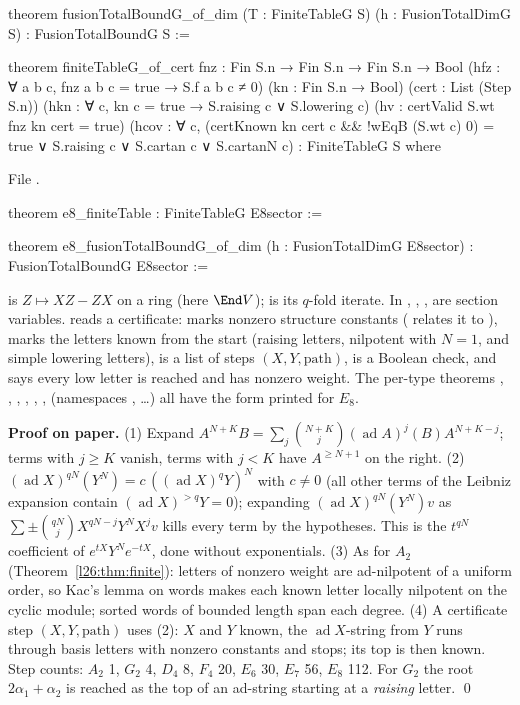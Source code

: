 \begin{leancode}
theorem fusionTotalBoundG_of_dim (T : FiniteTableG S) (h : FusionTotalDimG S) :
    FusionTotalBoundG S :=

theorem finiteTableG_of_cert {fnz : Fin S.n → Fin S.n → Fin S.n → Bool}
    (hfz : ∀ a b c, fnz a b c = true → S.f a b c ≠ 0) (kn : Fin S.n → Bool) (cert : List (Step S.n))
    (hkn : ∀ c, kn c = true → S.raising c ∨ S.lowering c) (hv : certValid S.wt fnz kn cert = true)
    (hcov : ∀ c, (certKnown kn cert c && !wEqB (S.wt c) 0) = true ∨
      S.raising c ∨ S.cartan c ∨ S.cartanN c) :
    FiniteTableG S where
\end{leancode}
\noindent File .
\begin{leancode}
theorem e8_finiteTable : FiniteTableG E8sector :=

theorem e8_fusionTotalBoundG_of_dim (h : FusionTotalDimG E8sector) :
    FusionTotalBoundG E8sector :=
\end{leancode}

\begin{dictionary}
 is $Z\mapsto XZ-ZX$ on a ring (here $\End V$);  is its $q$-fold iterate. In
, , ,  are section variables.  reads a
certificate:  marks nonzero structure constants ( relates it to ),  marks the letters known
from the start (raising letters, nilpotent with $N=1$, and simple lowering letters),  is a list of steps
$(X,Y,\text{path})$,  is a Boolean check, and  says every low letter is reached and has nonzero weight.
The per-type theorems , , , , , , 
(namespaces , \dots) all have the form printed for $E_8$.
\end{dictionary}

\textbf{Proof on paper.} (1) Expand $A^{N+K}B=\sum_j\binom{N+K}j(\operatorname{ad}A)^j(B)A^{N+K-j}$; terms with $j\ge K$ vanish,
terms with $j<K$ have $A^{\ge N+1}$ on the right. (2) $(\operatorname{ad}X)^{qN}(Y^N)=c\,((\operatorname{ad}X)^qY)^N$ with $c\neq0$ (all
other terms of the Leibniz expansion contain $(\operatorname{ad}X)^{>q}Y=0$); expanding $(\operatorname{ad}X)^{qN}(Y^N)v$ as
$\sum\pm\binom{qN}jX^{qN-j}Y^NX^jv$ kills every term by the hypotheses. This is the $t^{qN}$ coefficient of
$e^{tX}Y^Ne^{-tX}$, done without exponentials. (3) As for $A_2$ (Theorem~\ref{l26:thm:finite}): letters of nonzero weight are
ad-nilpotent of a uniform order, so Kac's lemma on words makes each known letter locally nilpotent on the cyclic module; sorted words
of bounded length span each degree. (4) A certificate step $(X,Y,\text{path})$ uses (2): $X$ and $Y$ known, the $\operatorname{ad}X$-string
from $Y$ runs through basis letters with nonzero constants and stops; its top is then known. Step counts: $A_2$ 1, $G_2$ 4, $D_4$ 8,
$F_4$ 20, $E_6$ 30, $E_7$ 56, $E_8$ 112. For $G_2$ the root $2\alpha_1+\alpha_2$ is reached as the top of an ad-string starting at a
\emph{raising} letter. \qed

